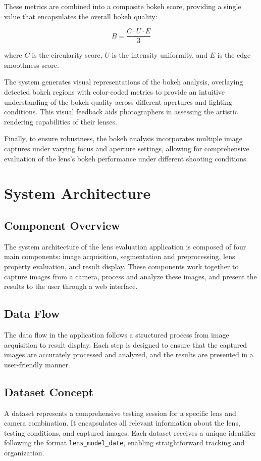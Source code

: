 These metrics are combined into a composite bokeh score, providing a single value that encapsulates the overall bokeh quality:

\begin{equation}
B = \frac{C \cdot U \cdot E}{3}
\end{equation}

where \( C \) is the circularity score, \( U \) is the intensity uniformity, and \( E \) is the edge smoothness score.

The system generates visual representations of the bokeh analysis, overlaying detected bokeh regions with color-coded metrics to provide an intuitive understanding of the bokeh quality across different apertures and lighting conditions. This visual feedback aids photographers in assessing the artistic rendering capabilities of their lenses.

Finally, to ensure robustness, the bokeh analysis incorporates multiple image captures under varying focus and aperture settings, allowing for comprehensive evaluation of the lens's bokeh performance under different shooting conditions.

\section{System Architecture}

\subsection{Component Overview}
The system architecture of the lens evaluation application is composed of four main components: image acquisition, segmentation and preprocessing, lens property evaluation, and result display. These components work together to capture images from a camera, process and analyze these images, and present the results to the user through a web interface.

\subsection{Data Flow}
The data flow in the application follows a structured process from image acquisition to result display. Each step is designed to ensure that the captured images are accurately processed and analyzed, and the results are presented in a user-friendly manner.

\subsection{Dataset Concept}
A dataset represents a comprehensive testing session for a specific lens and camera combination. It encapsulates all relevant information about the lens, testing conditions, and captured images. Each dataset receives a unique identifier following the format \texttt{lens\_model\_date}, enabling straightforward tracking and organization.

